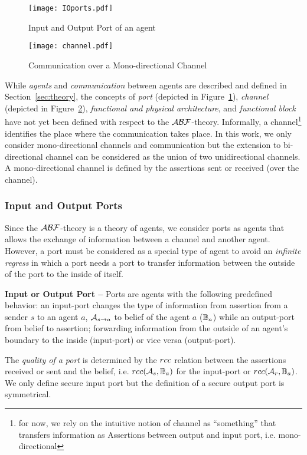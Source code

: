 \begin{figure}[t]
	\centering
	\texttt{[image: IOports.pdf]}
	\caption{Input and Output Port of an agent}
	\label{fig:ioports}
\end{figure}

\begin{figure}[t]
	\centering
	\texttt{[image: channel.pdf]}
	\caption{Communication over a Mono-directional Channel}
	\label{fig:channel}
\end{figure}

While \emph{agents} and \emph{communication} between agents are described and
defined in Section~\ref{sec:theory}, the concepts of \emph{port} (depicted in
Figure~\ref{fig:ioports}), \emph{channel} (depicted in
Figure~\ref{fig:channel}), \emph{functional and physical architecture}, and
\emph{functional block} have not yet been defined with respect to the
$\mathcal{A}\mathcal{B}\mathcal{F}$-theory.  Informally, a channel\footnote{for now, we rely on the
intuitive notion of channel as ``something'' that transfers information as
Assertions between output and input port, i.e. mono-directional} identifies the
place where the communication takes place.  In this work, we only consider
mono-directional channels and communication but the extension to bi-directional
channel can be considered as the union of two unidirectional channels. A
mono-directional channel is defined by the assertions sent or received (over
the channel). 

\subsubsection{Input and Output Ports}
Since the $\mathcal{A}\mathcal{B}\mathcal{F}$-theory is a theory of agents, we consider ports as agents that
allows the exchange of information between a channel and another
agent.  However, a port must be considered as a special type of agent to avoid
an \emph{infinite regress} in which a port needs a port to transfer information
between the outside of the port to the inside of itself.

\begin{definition}{\bf Input or Output Port --}\label{def:port} 
	Ports are agents with the following predefined behavior: an input-port changes
	the type of information from assertion from a sender $s$ to an agent $a$,
	$\rassert{s}{a}$ to belief of the agent $a$ ($\mathbb{B}_a$) while an
	output-port from belief to assertion; forwarding information from the outside
	of an agent's boundary to the inside (input-port) or vice versa (output-port). 
\end{definition}
The \emph{quality of a port} is determined by the $rcc$ relation between the 
assertions received or sent and the belief, i.e. $rcc(\mathcal{A}_s,\mathbb{B}_a)$ for the input-port
or $rcc(\mathcal{A}_r,\mathbb{B}_a)$. We only define secure input port but the
definition of a secure output port is symmetrical.

